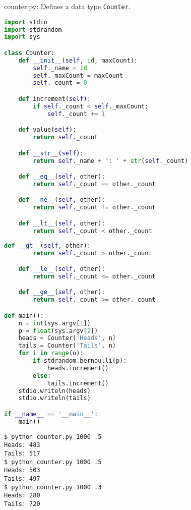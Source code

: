 \documentclass[8pt,a4paper,compress,handout]{beamer}
\begin{document}
\begin{frame}[fragile]
\begin{framed}
\tiny counter.py: Defines a data type \lstinline{Counter}.
\end{framed}

\begin{lstlisting}[language=Python]
import stdio
import stdrandom
import sys

class Counter:
    def __init__(self, id, maxCount):
        self._name = id
        self._maxCount = maxCount
        self._count = 0

    def increment(self):
        if self._count < self._maxCount:
            self._count += 1

    def value(self):
        return self._count

    def __str__(self):
        return self._name + ': ' + str(self._count)

    def __eq__(self, other):
        return self._count == other._count

    def __ne__(self, other):
        return self._count != other._count

    def __lt__(self, other):
        return self._count < other._count
\end{lstlisting}
\end{frame}

\begin{frame}[fragile]
\begin{lstlisting}[language=Python]
    def __gt__(self, other):
        return self._count > other._count

    def __le__(self, other):
        return self._count <= other._count

    def __ge__(self, other):
        return self._count >= other._count

def main():
    n = int(sys.argv[1])
    p = float(sys.argv[2])
    heads = Counter('Heads', n)
    tails = Counter('Tails', n)
    for i in range(n):
        if stdrandom.bernoulli(p):
            heads.increment()
        else:
            tails.increment()
    stdio.writeln(heads)
    stdio.writeln(tails)

if __name__ == '__main__':
    main()
\end{lstlisting}

\begin{lstlisting}[language={}]
$ python counter.py 1000 .5
Heads: 483
Tails: 517
$ python counter.py 1000 .5
Heads: 503
Tails: 497
$ python counter.py 1000 .3
Heads: 280
Tails: 720
\end{lstlisting}
\end{frame}
\end{document}
